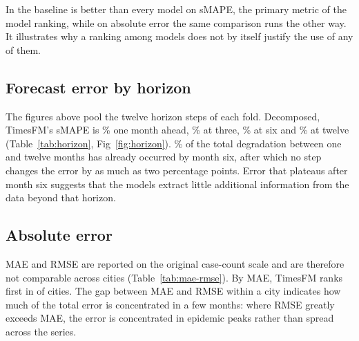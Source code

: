 \documentclass[10pt,letterpaper]{article}
\begin{document}
{In  the baseline is better than every model on sMAPE, the primary metric of the model ranking, while on absolute error the same comparison runs the other way. It illustrates why a ranking among models does not by itself justify the use of any of them.




\subsection*{Forecast error by horizon}

The figures above pool the twelve horizon steps of each fold. Decomposed, TimesFM's sMAPE is \% one month ahead, \% at three, \% at six and \% at twelve (Table~\ref{tab:horizon}, Fig~\ref{fig:horizon}). \% of the total degradation between one and twelve months has already occurred by month six, after which no step changes the error by as much as two percentage points. Error that plateaus after month six suggests that the models extract little additional information from the data beyond that horizon.




\subsection*{Absolute error}

MAE and RMSE are reported on the original case-count scale and are therefore not comparable across cities (Table~\ref{tab:mae-rmse}). By MAE, TimesFM ranks first in  of  cities. The gap between MAE and RMSE within a city indicates how much of the total error is concentrated in a few months: where RMSE greatly exceeds MAE, the error is concentrated in epidemic peaks rather than spread across the series.

}
\end{document}

